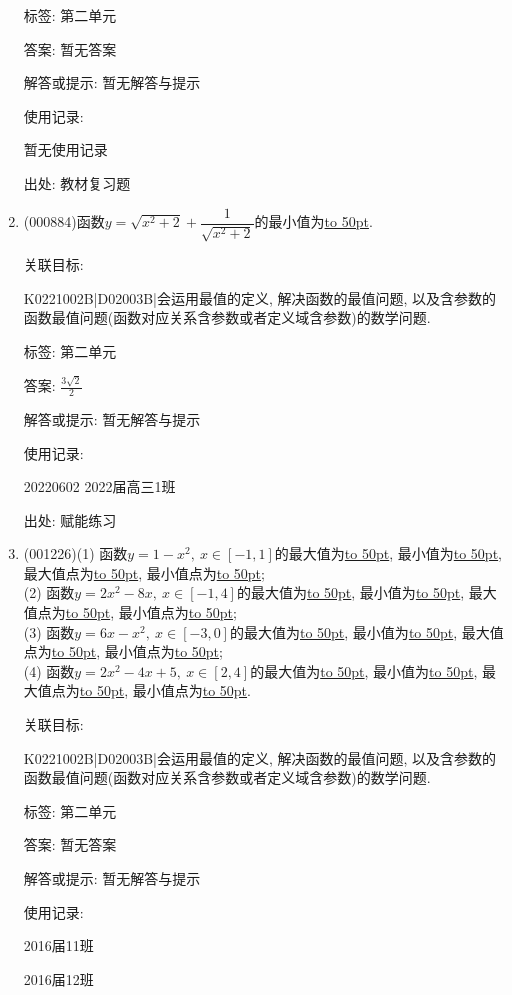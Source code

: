 \documentclass[10pt,a4paper]{article}
\newcommand{\blank}[1]{\underline{\hbox to #1pt{}}}
\begin{document}
\begin{enumerate}[1.]
标签: 第二单元

答案: 暂无答案

解答或提示: 暂无解答与提示

使用记录:

暂无使用记录


出处: 教材复习题
\item { (000884)}函数$y=\sqrt{x^2+2}+\dfrac1{\sqrt{x^2+2}}$的最小值为\blank{50}.


关联目标:

K0221002B|D02003B|会运用最值的定义, 解决函数的最值问题, 以及含参数的函数最值问题(函数对应关系含参数或者定义域含参数)的数学问题.



标签: 第二单元

答案: $\frac{3\sqrt 2}2$

解答或提示: 暂无解答与提示

使用记录:

20220602	2022届高三1班	


出处: 赋能练习
\item { (001226)}(1) 函数$y=1-x^2, \ x\in [-1,1]$的最大值为\blank{50}, 最小值为\blank{50}, 最大值点为\blank{50}, 最小值点为\blank{50};\\ 
(2) 函数$y=2x^2-8x, \ x\in [-1,4]$的最大值为\blank{50}, 最小值为\blank{50}, 最大值点为\blank{50}, 最小值点为\blank{50};\\ 
(3) 函数$y=6x-x^2, \ x\in [-3,0]$的最大值为\blank{50}, 最小值为\blank{50}, 最大值点为\blank{50}, 最小值点为\blank{50};\\ 
(4) 函数$y=2x^2-4x+5, \ x\in [2,4]$的最大值为\blank{50}, 最小值为\blank{50}, 最大值点为\blank{50}, 最小值点为\blank{50}.


关联目标:

K0221002B|D02003B|会运用最值的定义, 解决函数的最值问题, 以及含参数的函数最值问题(函数对应关系含参数或者定义域含参数)的数学问题.



标签: 第二单元

答案: 暂无答案

解答或提示: 暂无解答与提示

使用记录:

2016届11班				

2016届12班				



\end{enumerate}
\end{document}
